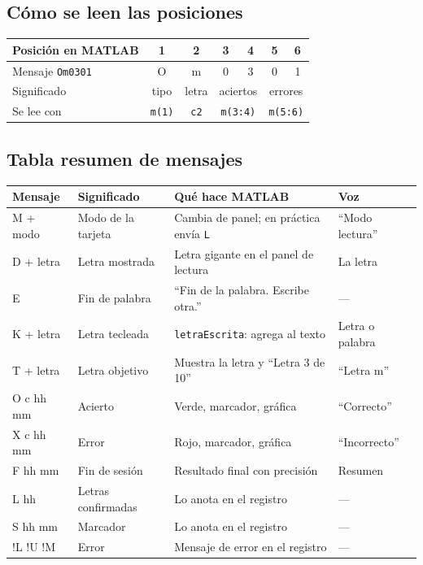 \documentclass[11pt,a4paper]{article}
\newcommand{\cod}[1]{\texttt{#1}}
\begin{document}
\subsection{Cómo se leen las posiciones}
\begin{center}
\begin{tabular}{l c c c c c c}
\toprule
\textbf{Posición en MATLAB} & 1 & 2 & 3 & 4 & 5 & 6 \\
\midrule
Mensaje \cod{Om0301} & O & m & 0 & 3 & 0 & 1 \\
Significado & tipo & letra & \multicolumn{2}{c}{aciertos} & \multicolumn{2}{c}{errores} \\
Se lee con & \cod{m(1)} & \cod{c2} & \multicolumn{2}{c}{\cod{m(3:4)}} & \multicolumn{2}{c}{\cod{m(5:6)}} \\
\bottomrule
\end{tabular}
\end{center}

\subsection{Tabla resumen de mensajes}
\begin{longtable}{>{\ttfamily}p{2cm} p{3.6cm} p{5.6cm} p{2.6cm}}
\toprule
\normalfont\textbf{Mensaje} & \textbf{Significado} & \textbf{Qué hace MATLAB} & \textbf{Voz} \\
\midrule
\endhead
M + modo & Modo de la tarjeta & Cambia de panel; en práctica envía \cod{L} & ``Modo lectura'' \\
D + letra & Letra mostrada & Letra gigante en el panel de lectura & La letra \\
E & Fin de palabra & ``Fin de la palabra. Escribe otra.'' & --- \\
K + letra & Letra tecleada & \cod{letraEscrita}: agrega al texto & Letra o palabra \\
T + letra & Letra objetivo & Muestra la letra y ``Letra 3 de 10'' & ``Letra m'' \\
O c hh mm & Acierto & Verde, marcador, gráfica & ``Correcto'' \\
X c hh mm & Error & Rojo, marcador, gráfica & ``Incorrecto'' \\
F hh mm & Fin de sesión & Resultado final con precisión & Resumen \\
L hh & Letras confirmadas & Lo anota en el registro & --- \\
S hh mm & Marcador & Lo anota en el registro & --- \\
!L !U !M & Error & Mensaje de error en el registro & --- \\
\bottomrule
\end{longtable}
\end{document}
